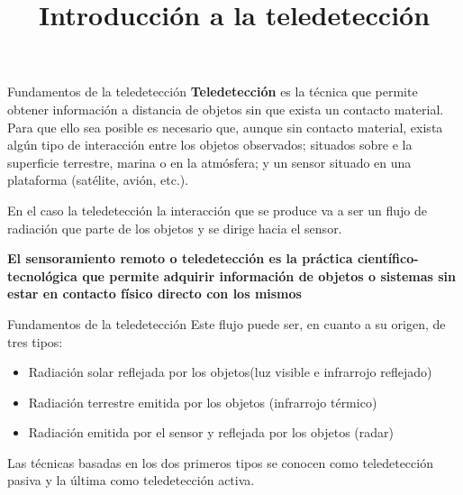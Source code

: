 \documentclass[
  ignorenonframetext,
]{beamer}
\title{Introducción a la teledetección}
\author{}
\date{\vspace{-2.5em}}
\providecommand{\tightlist}{%
  \setlength{\itemsep}{0pt}\setlength{\parskip}{0pt}}
\begin{document}
\frame{\titlepage}

\begin{frame}{Fundamentos de la teledetección}
\protect\hypertarget{fundamentos-de-la-teledetecciuxf3n}{}
\textbf{Teledetección} es la técnica que permite obtener información a
distancia de objetos sin que exista un contacto material. Para que ello
sea posible es necesario que, aunque sin contacto material, exista algún
tipo de interacción entre los objetos observados; situados sobre e la
superficie terrestre, marina o en la atmósfera; y un sensor situado en
una plataforma (satélite, avión, etc.).

En el caso la teledetección la interacción que se produce va a ser un
flujo de radiación que parte de los objetos y se dirige hacia el sensor.

\textbf{El sensoramiento remoto o teledetección es la práctica
científico-tecnológica que permite adquirir información de objetos o
sistemas sin estar en contacto físico directo con los mismos}
\end{frame}

\begin{frame}{Fundamentos de la teledetección}
\protect\hypertarget{fundamentos-de-la-teledetecciuxf3n-1}{}
Este flujo puede ser, en cuanto a su origen, de tres tipos:

\begin{itemize}
\tightlist
\item
  Radiación solar reflejada por los objetos(luz visible e infrarrojo
  reflejado)
\item
  Radiación terrestre emitida por los objetos (infrarrojo térmico)
\item
  Radiación emitida por el sensor y reflejada por los objetos (radar)
\end{itemize}

Las técnicas basadas en los dos primeros tipos se conocen como
teledetección pasiva y la última como teledetección activa.
\end{frame}
\end{document}
